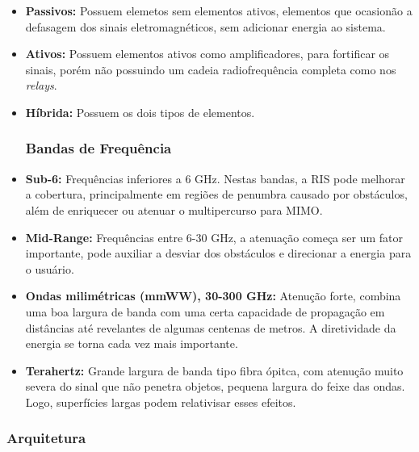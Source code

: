 \documentclass[
	12pt,				%
	openright,			%
	oneside,			%
	a4paper,			%
	english,			%
	brazil				%
	]{abntex2}
\begin{document}
\begin{itemize}

\item \textbf{Passivos:} Possuem elemetos sem elementos ativos, elementos que ocasionão a defasagem dos sinais eletromagnéticos, sem adicionar energia ao sistema.

\item \textbf{Ativos:} Possuem elementos ativos como amplificadores, para fortificar os sinais, porém não possuindo um cadeia radiofrequência completa como nos \textit{relays}.

\item \textbf{Híbrida:} Possuem os dois tipos de elementos.

\subsubsection{Bandas de Frequência} 

\item \textbf{Sub-6:} Frequências inferiores a 6 GHz. Nestas bandas, a RIS pode melhorar a cobertura, principalmente em regiões de penumbra causado por obstáculos, além de enriquecer ou atenuar o multipercurso para MIMO.

\item \textbf{Mid-Range:} Frequências entre 6-30 GHz, a atenuação começa ser um fator importante, pode auxiliar a desviar dos obstáculos e direcionar a energia para o usuário.

\item \textbf{Ondas milimétricas (mmWW), 30-300 GHz:} Atenução forte, combina uma boa largura de banda com uma certa capacidade de propagação em distâncias até revelantes de algumas centenas de metros. A diretividade da energia se torna cada vez mais importante.

\item \textbf{Terahertz: }Grande largura de banda tipo fibra ópitca, com atenução muito severa do sinal que não penetra objetos, pequena largura do feixe das ondas. Logo, superfícies largas podem relativisar esses efeitos. 
\end{itemize}

\subsubsection{Arquitetura} 
\end{document}
